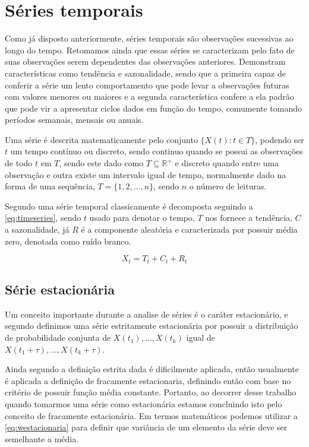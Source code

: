 \documentclass[
    12pt,
    oneside,
    a4paper,
    english,
    brazil
]{abntex2}
\begin{document}
\section{Séries temporais}

Como já disposto anteriormente, séries temporais são observações sucessivas ao
longo do tempo. Retomamos ainda que essas séries se caracterizam pelo fato de
suas observações serem dependentes das observações anteriores. Demonstram
características como tendência e sazonalidade, sendo que a primeira capaz de
conferir a série um lento comportamento que pode levar a observações futuras
com valores menores ou maiores e a segunda característica confere a ela padrão
que pode vir a apresentar ciclos dados em função do tempo, comumente tomando
períodos semanais, mensais ou anuais.

Uma série é descrita matematicamente pelo conjunto $\{X(t): t \in T\}$, podendo
ser $t$ um tempo contínuo ou discreto, sendo continuo quando se possui as
observações de todo $t$ em $T$, sendo este dado como $T \subseteq
\mathbb{R}^{+}$ e discreto quando entre uma observação e outra existe um
intervalo igual de tempo, normalmente dado na forma de uma sequência, $T = \{1,
2, \ldots, n\}$, sendo $n$ o número de leituras.

Segundo  uma série temporal classicamente é decomposta
seguindo a \autoref{eq:timeseries}, sendo $t$ usado para denotar o tempo, $T$
nos fornece a tendência, $C$ a sazonalidade, já $R$ é a componente aleatória e
caracterizada por possuir média zero, denotada como ruído branco.

\begin{equation}
    \label{eq:timeseries}
    X_t = T_t + C_t + R_t
\end{equation}

\subsection{Série estacionária}

Um conceito importante durante a analise de séries é o caráter estacionário, e
segundo  definimos uma série estritamente estacionária por
possuir a distribuição de probabilidade conjunta de $X(t_1), \ldots, X(t_k)$
igual de $X(t_1 + \tau), \ldots, X(t_k + \tau)$.

Ainda segundo  a definição estrita dada é dificilmente
aplicada, então usualmente é aplicada a definição de fracamente estacionaria,
definindo então com base no critério de possuir função média constante.
Portanto, ao decorrer desse trabalho quando tomarmos uma série como
estacionária estamos concluindo isto pelo conceito de fracamente estacionária.
Em termos matemáticos podemos utilizar a \autoref{eq:westacionaria} para
definir que variância de um elemento da série deve ser semelhante a média.
\end{document}
